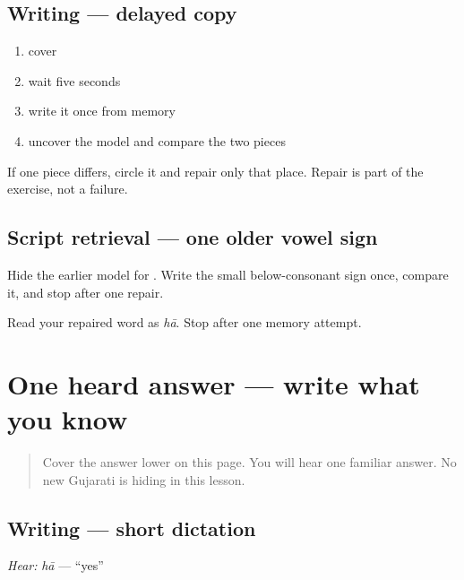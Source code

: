 \subsection*{Writing — delayed copy}

\begin{enumerate}
\raggedright
  \item cover \textbf{}
  \item wait five seconds
  \item write it once from memory
  \item uncover the model and compare the two pieces
\end{enumerate}

If one piece differs, circle it and repair only that place. Repair is part of the exercise, not a failure.

\subsection*{Script retrieval — one older vowel sign}
Hide the earlier model for \textbf{}. Write the small below-consonant sign once, compare it, and stop after one repair.

\begin{tcolorbox}[breakable,colback=teal!4,colframe=teal!35!black,title={Before you move on}]
Read your repaired word as \emph{hā}. Stop after one memory attempt.
\end{tcolorbox}
\section[\texorpdfstring{\gu{હા} (hā)}{હા (hā)}]{One heard answer — write what you know}

\label{lesson:GU-W01-haa-dictation}



\begin{quote}
Cover the answer lower on this page. You will hear one familiar answer. No new Gujarati is hiding in this lesson.
\end{quote}

\subsection*{Writing — short dictation}
\emph{Hear:} \emph{hā} — \textquotedblleft{}yes\textquotedblright{}

